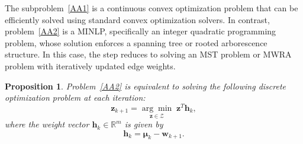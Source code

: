 \documentclass[11pt,a4paper]{article}
\theoremstyle{plain}
\newtheorem{proposition}[theorem]{Proposition}
\theoremstyle{definition}
\theoremstyle{remark}
\begin{document}
	The subproblem~\eqref{AA1} is a continuous convex optimization problem that can be efficiently solved using standard convex optimization solvers. In contrast, problem~\eqref{AA2} is a MINLP, specifically an integer quadratic programming problem, whose solution enforces a spanning tree or rooted arborescence structure. In this case, the step reduces to solving an MST problem or MWRA problem with iteratively updated edge weights.
	
	
	\begin{proposition}
		\label{Proposition} Problem~\eqref{AA2} is equivalent to solving the
		following discrete optimization problem at each iteration: 
		\begin{equation}
			\boldsymbol{z}_{k+1}=\underset{\boldsymbol{z}\in \mathcal{Z}}{\arg \min }\;%
			\boldsymbol{z}^{T}\boldsymbol{h}_{k},  \label{weight}
		\end{equation}%
		where the weight vector $\boldsymbol{h}_{k}\in \mathbb{R}^{m}$ is given by 
		\begin{equation}
			\boldsymbol{h}_{k}=\boldsymbol{\mu }_{k}-\boldsymbol{w}_{k+1}.  \label{h_k}
		\end{equation}%
	\end{proposition}
	
\end{document}
